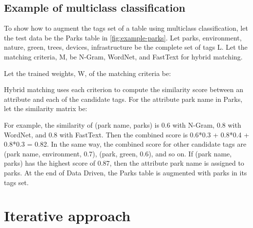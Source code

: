 \subsection{Example of multiclass classification}

To show how to augment the tags set of a table using multiclass classification, let the test data be the Parks table in \autoref{fig:example-parks}. Let {parks, environment, nature, green, trees, devices, infrastructure} be the complete set of tags L. Let the matching criteria, M, be {N-Gram, WordNet, and FastText} for hybrid matching.

Let the trained weights, W, of the matching criteria be:

Hybrid matching uses each criterion to compute the similarity score between an attribute and each of the candidate tags. For the attribute park name in Parks, let the similarity matrix be:

For example, the similarity of (park name, parks) is 0.6 with N-Gram, 0.8 with WordNet, and 0.8 with FastText. Then the combined score is 0.6*0.3 + 0.8*0.4 + 0.8*0.3 = 0.82. In the same way, the combined score for other candidate tags are (park name, environment, 0.7), (park, green, 0.6), and so on. If (park name, parks) has the highest score of 0.87, then the attribute park name is assigned to parks. At the end of Data Driven, the Parks table is augmented with parks in its tags set.

\section{Iterative approach}
\label{sec:IterativeApproach}

